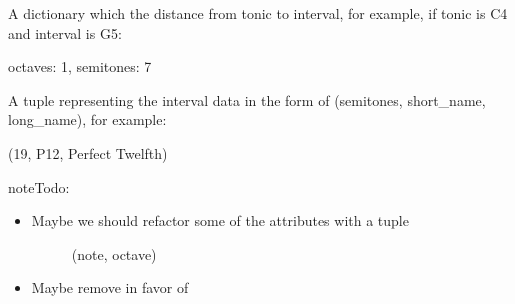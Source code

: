 \documentclass[letterpaper,10pt,english]{sphinxmanual}
\begin{document}
\begin{fulllineitems}
\begin{fulllineitems}
\end{fulllineitems}


\begin{fulllineitems}
\label{\detokenize{birdears:birdears.interval.ChromaticInterval.distance}}
 \textendash{} A dictionary which the distance from tonic to
interval, for example, if tonic is C4 and interval is G5:

\begin{sphinxVerbatim}[commandchars=\\\{\}]
\PYGZob{}
    \PYGZsq{}octaves\PYGZsq{}: 1,
    \PYGZsq{}semitones\PYGZsq{}: 7
\PYGZcb{}
\end{sphinxVerbatim}

\end{fulllineitems}


\begin{fulllineitems}
\label{\detokenize{birdears:birdears.interval.ChromaticInterval.data}}
 \textendash{} A tuple representing the interval data in the form of
(semitones, short\_name, long\_name), for example:

\begin{sphinxVerbatim}[commandchars=\\\{\}]
(19, \PYGZsq{}P12\PYGZsq{}, \PYGZsq{}Perfect Twelfth\PYGZsq{})
\end{sphinxVerbatim}

\end{fulllineitems}


\begin{sphinxadmonition}{note}{\label{birdears:index-0}Todo:}\begin{itemize}
\item {} \begin{description}
\item[{Maybe we should refactor some of the attributes with a tuple}] \leavevmode
(note, octave)

\end{description}

\item {} 
Maybe remove  in favor of 

\end{itemize}
\end{sphinxadmonition}


\end{fulllineitems}
\end{document}
